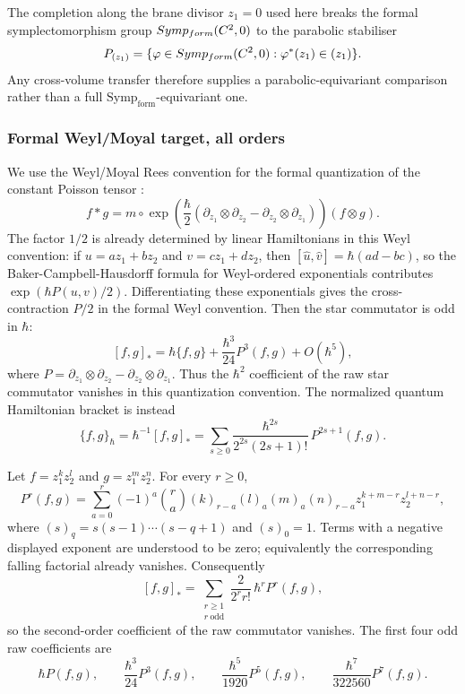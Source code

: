 \documentclass[11pt]{memoir}
\begin{document}
\begin{rmk}\label{rmk:parabolic-functoriality}
  The completion along the brane divisor \(z_1=0\) used here breaks the
  formal symplectomorphism group \(Symp_{form}(C^2,0)\)
  to the parabolic stabiliser
  \[
    P_{(z_1)}=
    \{\varphi\in Symp_{form}(C^2,0):
      \varphi^*(z_1)\in (z_1)\}.
  \]
  Any cross-volume transfer therefore supplies a parabolic-equivariant
  comparison rather than a full
  \(\mathrm{Symp}_{\mathrm{form}}\)-equivariant one.
\end{rmk}

\subsubsection{Formal Weyl/Moyal target, all orders}
We use the Weyl/Moyal Rees convention for the formal quantization of the
constant Poisson tensor \cite{kontsevich-dq}:
$$f*g=m\circ\exp\left(\frac{\hbar}{2}
  (\partial_{z_1}\otimes\partial_{z_2}
   -\partial_{z_2}\otimes\partial_{z_1})\right)(f\otimes g).$$
The factor $1/2$ is already determined by linear Hamiltonians in this
Weyl convention: if
$u=az_1+bz_2$ and $v=cz_1+dz_2$, then
$[\widehat u,\widehat v]=\hbar(ad-bc)$, so the Baker-Campbell-Hausdorff
formula for Weyl-ordered exponentials contributes
$\exp(\hbar P(u,v)/2)$. Differentiating these exponentials gives the
cross-contraction $P/2$ in the formal Weyl convention.
Then the star commutator is odd in $\hbar$:
$$[f,g]_*=\hbar\{f,g\}+\frac{\hbar^3}{24}P^3(f,g)+O(\hbar^5),$$
where $P=\partial_{z_1}\otimes\partial_{z_2}
-\partial_{z_2}\otimes\partial_{z_1}$. Thus the \(\hbar^2\) coefficient
of the raw star commutator vanishes in this quantization convention. The
normalized quantum Hamiltonian bracket is
instead
$$\{f,g\}_\hbar=\hbar^{-1}[f,g]_*
  =\sum_{s\geq0}
    \frac{\hbar^{2s}}{2^{2s}(2s+1)!}\,P^{2s+1}(f,g).$$

\begin{prop}\label{prop:moyal-monomial}
  Let $f=z_1^kz_2^l$ and $g=z_1^mz_2^n$. For every $r\geq0$,
  $$P^r(f,g)=
    \sum_{a=0}^r(-1)^a\binom{r}{a}
    (k)_{r-a}(l)_a(m)_a(n)_{r-a}
    z_1^{k+m-r}z_2^{l+n-r},$$
  where $(s)_q=s(s-1)\cdots(s-q+1)$ and $(s)_0=1$. Terms with a negative
  displayed exponent are understood to be zero; equivalently the corresponding
  falling factorial already vanishes. Consequently
  $$[f,g]_*=\sum_{\substack{r\geq1\\ r\ \mathrm{odd}}}
    \frac{2}{2^r r!}\,\hbar^r P^r(f,g),$$
  so the second-order coefficient of the raw commutator vanishes. The first
  four odd raw coefficients are
  $$\hbar P(f,g),\qquad
    \frac{\hbar^3}{24}P^3(f,g),\qquad
    \frac{\hbar^5}{1920}P^5(f,g),\qquad
    \frac{\hbar^7}{322560}P^7(f,g).$$
\end{prop}
\end{document}

